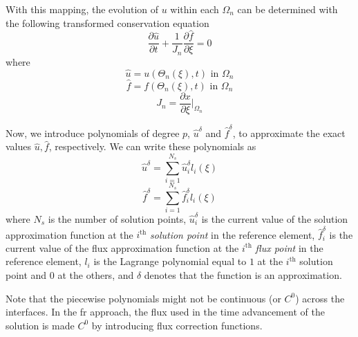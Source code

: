 With this mapping, the evolution of $u$ within each $\Omega_n$ can be determined with the following 
transformed conservation equation
\begin{equation}
\frac{\partial \hat{u}}{\partial t} + \frac{1}{J_n}\frac{\partial \hat{f}}{\partial \xi} = 0
\end{equation}
where
\begin{equation}
\hat{u} = u(\Theta_n(\xi),t) \text{ in } \Omega_n
\end{equation}
\begin{equation}
\hat{f} = f(\Theta_n(\xi),t) \text{ in } \Omega_n
\end{equation}
\begin{equation}
J_n = \frac{\partial x}{\partial \xi} \bigg|_{\Omega_n}
\end{equation}

Now, we introduce polynomials of degree $p$, $\hat{u}^\delta$ and $\hat{f}^\delta$, to approximate the exact values $\hat{u},\hat{f}$, respectively. We can write these polynomials as
\begin{equation}
\hat{u}^\delta = \sum_{i=1}^{N_s} \hat{u}_i^\delta l_i(\xi)
\end{equation}
\begin{equation}
\hat{f}^\delta = \sum_{i=1}^{N_s} \hat{f}_i^\delta l_i(\xi)
\end{equation}
where $N_s$ is the number of solution points, $\hat{u}_i^\delta$ is the current value of the 
solution approximation function at the $i^\text{th}$ \emph{solution point} in the reference element, 
$\hat{f}_i^\delta$ is the current value of the flux approximation function at the $i^\text{th}$ 
\emph{flux point} in the reference element, $l_i$ is the Lagrange polynomial equal to $1$ at the 
$i^\text{th}$ solution point and $0$ at the others, and $\delta$ denotes that the function is an 
approximation.

Note that the piecewise polynomials might not be continuous (or $C^0$) across the interfaces. In the 
\gls{fr} approach, the flux used in the time advancement of the solution is made $C^0$ 
by introducing flux correction functions.

